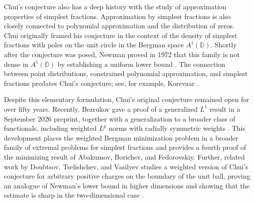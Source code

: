 \documentclass{article}
\begin{document}
Chui's conjecture also has a deep history with the study of approximation properties of simplest fractions. Approximation by simplest fractions is also closely connected to polynomial approximation and the distribution of zeros. Chui originally framed his conjecture in the context of the density of simplest fractions with poles on the unit circle in the Bergman space $A^1(\mathbb{D})$. Shortly after the conjecture was posed, Newman proved in 1972 that this family is not dense in $A^1(\mathbb{D})$ by establishing a uniform lower bound \cite{Newman1972}. The connection between point distributions, constrained polynomial approximation, and simplest fractions predates Chui's conjecture; see, for example, Korevaar \cite{Korevaar1964}.

Despite this elementary formulation, Chui's original conjecture remained open for over fifty years. Recently, Bezrukov gave a proof of a generalized $L^1$ result in a September 2026 preprint, together with a generalization to a broader class of functionals, including weighted $L^p$ norms with radially symmetric weights \cite{Bezrukov2026}. This development places the weighted Bergman minimization problem in a broader family of extremal problems for simplest fractions and provides a fourth proof of the minimizing result of Abakumov, Borichev, and Fedorovskiy. Further, related work by Doubtsov, Tselishchev, and Vasilyev studies a weighted version of Chui's conjecture for arbitrary positive charges on the boundary of the unit ball, proving an analogue of Newman's lower bound in higher dimensions and showing that the estimate is sharp in the two-dimensional case \cite{DoubtsovTselishchevVasilyev2026}.



\end{document}
